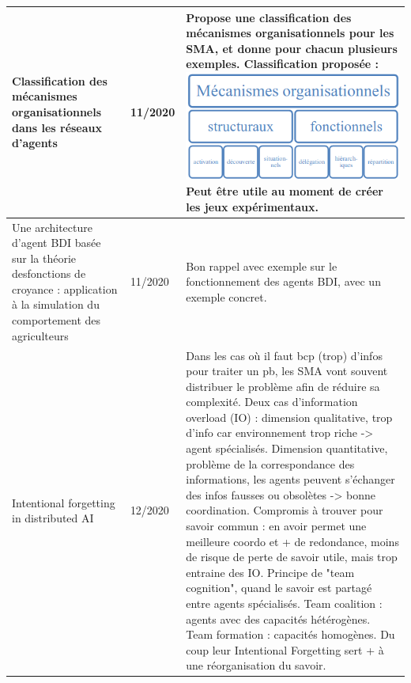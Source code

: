 \documentclass[french]{article}
\begin{document}
    \begin{table}[ht!]
        \begin{center}
        \begin{tabular}{|p{}|p{}|p{}|}
            \hline
            
            Classification des mécanismes organisationnels dans les réseaux d’agents \cite{lacomme_classification_2009}
            & 11/2020
            & Propose une classification des mécanismes organisationnels pour les SMA, et donne pour chacun plusieurs exemples. Classification proposée :
            \includegraphics[width=8cm]{images/meca_orga.png}
            Peut être utile au moment de créer les jeux expérimentaux.
            \\
            \hline
            Une architecture d’agent BDI basée sur la théorie desfonctions de croyance : application à la simulation du comportement des agriculteurs \cite{taillandier_architecture_2012}
            & 11/2020
            & Bon rappel avec exemple sur le fonctionnement des agents BDI, avec un exemple concret. \\
            \hline
            Intentional forgetting in distributed AI \cite{reuter_intentional_2019}
            & 12/2020
            & Dans les cas où il faut bcp (trop) d'infos pour traiter un pb, les SMA vont souvent distribuer le problème afin de réduire sa complexité.
            Deux cas d'information overload (IO) : dimension qualitative, trop d'info car environnement trop riche -> agent spécialisés. Dimension quantitative, problème de la correspondance des informations, les agents peuvent s'échanger des infos fausses ou obsolètes -> bonne coordination.
            Compromis à trouver pour savoir commun : en avoir permet une meilleure coordo et + de redondance, moins de risque de perte de savoir utile, mais trop entraine des IO. 
            Principe de "team cognition", quand le savoir est partagé entre agents spécialisés. Team coalition : agents avec des capacités hétérogènes. Team formation : capacités homogènes. Du coup leur Intentional Forgetting sert + à une réorganisation du savoir.

\end{tabular}
\end{center}
\end{table}
\end{document}

